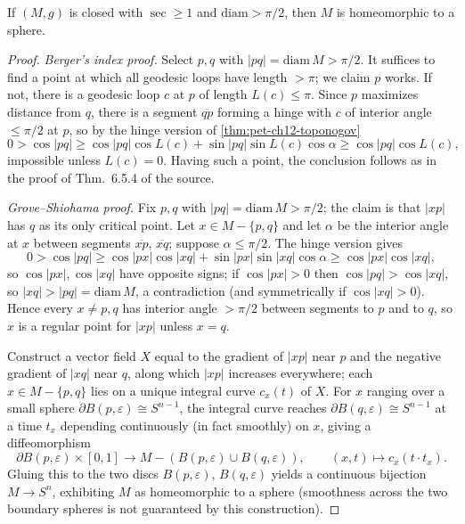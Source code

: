\begin{theorem}
  \label{thm:pet-ch12-diameter-sphere}
  If $(M,g)$ is closed with $\sec\ge1$ and $\mathrm{diam}>\pi/2$, then $M$ is
  homeomorphic to a sphere.
\end{theorem}
\begin{proof}
  \emph{Berger's index proof.} Select $p,q$ with $|pq|=\mathrm{diam}\,M>\pi/2$.
  It suffices to find a point at which all geodesic loops have length $>\pi$; we
  claim $p$ works. If not, there is a geodesic loop $c$ at $p$ of length
  $L(c)\le\pi$. Since $p$ maximizes distance from $q$, there is a segment
  $\overline{qp}$ forming a hinge with $c$ of interior angle $\le\pi/2$ at $p$,
  so by the hinge version of \cref{thm:pet-ch12-toponogov}
  \[
    0>\cos|pq|\ge\cos|pq|\cos L(c)+\sin|pq|\sin L(c)\cos\alpha\ge\cos|pq|\cos L(c),
  \]
  impossible unless $L(c)=0$. Having such a point, the conclusion follows as in
  the proof of Thm.\ 6.5.4 of the source.

  \emph{Grove--Shiohama proof.} Fix $p,q$ with $|pq|=\mathrm{diam}\,M>\pi/2$; the
  claim is that $|xp|$ has $q$ as its only critical point. Let
  $x\in M-\{p,q\}$ and let $\alpha$ be the interior angle at $x$ between
  segments $\overline{xp}$, $\overline{xq}$; suppose $\alpha\le\pi/2$. The hinge
  version gives
  \[
    0>\cos|pq|\ge\cos|px|\cos|xq|+\sin|px|\sin|xq|\cos\alpha\ge\cos|px|\cos|xq|,
  \]
  so $\cos|px|,\cos|xq|$ have opposite signs; if $\cos|px|>0$ then
  $\cos|pq|>\cos|xq|$, so $|xq|>|pq|=\mathrm{diam}\,M$, a contradiction (and
  symmetrically if $\cos|xq|>0$). Hence every $x\ne p,q$ has interior angle
  $>\pi/2$ between segments to $p$ and to $q$, so $x$ is a regular point for
  $|xp|$ unless $x=q$.

  Construct a vector field $X$ equal to the gradient of $|xp|$ near $p$ and the
  negative gradient of $|xq|$ near $q$, along which $|xp|$ increases everywhere;
  each $x\in M-\{p,q\}$ lies on a unique integral curve $c_x(t)$ of $X$. For $x$
  ranging over a small sphere $\partial B(p,\varepsilon)\cong S^{n-1}$, the
  integral curve reaches $\partial B(q,\varepsilon)\cong S^{n-1}$ at a time
  $t_x$ depending continuously (in fact smoothly) on $x$, giving a
  diffeomorphism
  \[
    \partial B(p,\varepsilon)\times[0,1]\to M-(B(p,\varepsilon)\cup B(q,\varepsilon)),
    \qquad(x,t)\mapsto c_x(t\cdot t_x).
  \]
  Gluing this to the two discs $B(p,\varepsilon)$, $B(q,\varepsilon)$ yields a
  continuous bijection $M\to S^n$, exhibiting $M$ as homeomorphic to a sphere
  (smoothness across the two boundary spheres is not guaranteed by this
  construction).
\end{proof}

